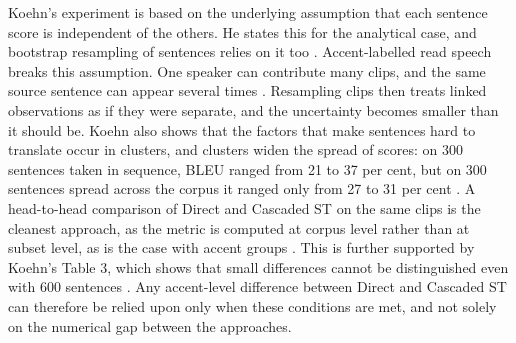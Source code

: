 Koehn's experiment is based on the underlying assumption that each sentence
score is independent of the others. He states this for the analytical case, and
bootstrap resampling of sentences relies on it too
\cite{koehn2004significance}. Accent-labelled read speech breaks this
assumption. One speaker can contribute many clips, and the same source sentence
can appear several times \cite{ardila2020commonvoice,wang2021covost2}.
Resampling clips then treats linked observations as if they were separate, and
the uncertainty becomes smaller than it should be. Koehn also shows that the
factors that make sentences hard to translate occur in clusters, and clusters
widen the spread of scores: on 300 sentences taken in sequence, BLEU ranged
from 21 to 37 per cent, but on 300 sentences spread across the corpus it ranged
only from 27 to 31 per cent \cite{koehn2004significance}. A head-to-head
comparison of Direct and Cascaded ST on the same clips is the cleanest approach,
as the metric is computed at corpus level rather than at subset level, as is the
case with accent groups \cite{papineni2002bleu}. This is further supported by
Koehn's Table 3, which shows that small differences cannot be distinguished
even with 600 sentences \cite{koehn2004significance}. Any accent-level
difference between Direct and Cascaded ST can therefore be relied upon only
when these conditions are met, and not solely on the numerical gap between the
approaches.
